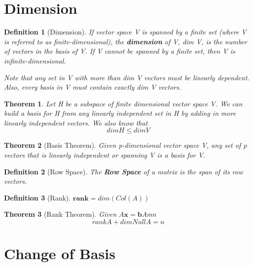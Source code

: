 \documentclass[12pt]{report}
\newtheorem{thm}{Theorem}
\newtheorem{dfn}{Definition}
\newcommand{\mateq}{$A\bm{x}=\bm{b}$}
\begin{document}
\section{Dimension}

\begin{dfn}[Dimension]

If vector space V is spanned by a finite set (where V is referred to as finite-dimensional), the \textbf{dimension} of V, dim V, is the number of vectors in the basis of V. If V cannot be spanned by a finite set, then V is infinite-dimensional.

Note that any set in V with more than dim V vectors must be linearly dependent. Also, every basis in V must contain exactly dim V vectors.

\end{dfn}

\begin{thm}

Let H be a subspace of finite dimensional vector space V. We can build a basis for H from any linearly independent set in H by adding in more linearly independent vectors. We also know that
\begin{equation}
dim H \leq dim V
\end{equation}

\end{thm}

\begin{thm}[Basis Theorem]

Given p-dimensional vector space V, any set of p vectors that is linearly independent or spanning V is a basis for V.

\end{thm}

\begin{dfn}[Row Space]
The \textbf{Row Space} of a matrix is the span of its row vectors.
\end{dfn}

\begin{dfn}[Rank]
$\bm{rank} = dim(Col(A))$
\end{dfn}

\begin{thm}[Rank Theorem]
Given \mateq{A}{m}{n}
\begin{equation}
rank A + dim Null A = n
\end{equation}
\end{thm}

\section{Change of Basis}
\end{document}
